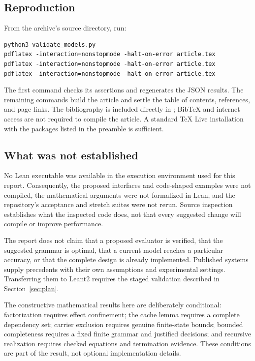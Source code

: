 \subsection{Reproduction}

From the archive's source directory, run:
\begin{lstlisting}
python3 validate_models.py
pdflatex -interaction=nonstopmode -halt-on-error article.tex
pdflatex -interaction=nonstopmode -halt-on-error article.tex
pdflatex -interaction=nonstopmode -halt-on-error article.tex
\end{lstlisting}

The first command checks its assertions and regenerates the JSON results. The remaining commands build the article and settle the table of contents, references, and page links. The bibliography is included directly in ; BibTeX and internet access are not required to compile the article. A standard TeX Live installation with the packages listed in the preamble is sufficient.

\subsection{What was not established}

No Lean executable was available in the execution environment used for this report. Consequently, the proposed interfaces and code-shaped examples were not compiled, the mathematical arguments were not formalized in Lean, and the repository's acceptance and stretch suites were not rerun. Source inspection establishes what the inspected code does, not that every suggested change will compile or improve performance.

The report does not claim that a proposed evaluator is verified, that the suggested grammar is optimal, that a current model reaches a particular accuracy, or that the complete design is already implemented. Published systems supply precedents with their own assumptions and experimental settings. Transferring them to Leant2 requires the staged validation described in Section~\ref{sec:plan}.

The constructive mathematical results here are deliberately conditional: factorization requires effect confinement; the cache lemma requires a complete dependency set; carrier exclusion requires genuine finite-state bounds; bounded completeness requires a fixed finite grammar and justified decisions; and recursive realization requires checked equations and termination evidence. These conditions are part of the result, not optional implementation details.
